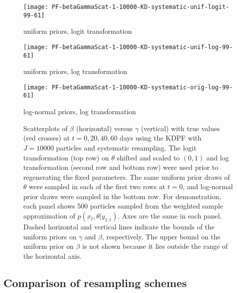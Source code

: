 \documentclass{elsarticle}
\begin{document}
\begin{figure}

\begin{minipage}{1.0\linewidth}
\texttt{[image: PF-betaGammaScat-1-10000-KD-systematic-unif-logit-99-61]}
\vspace{-1.0cm}
\caption*{uniform priors, logit transformation}
\end{minipage}

\vspace{0.5cm}

\begin{minipage}{1.0\linewidth}
\texttt{[image: PF-betaGammaScat-1-10000-KD-systematic-unif-log-99-61]}
\vspace{-1.0cm}
\caption*{uniform priors, log transformation}
\end{minipage}

\vspace{0.5cm}

\begin{minipage}{1.0\linewidth}
\texttt{[image: PF-betaGammaScat-1-10000-KD-systematic-orig-log-99-61]}
\vspace{-1.0cm}
\caption*{log-normal priors, log transformation}
\end{minipage}

\caption{Scatterplots of $\beta$ (horizontal) versus $\gamma$ (vertical) with true values (red crosses) at $t = 0, 20, 40, 60$ days using the KDPF with $J = 10000$ particles and systematic resampling. The logit transformation (top row) on $\theta$ shifted and scaled to $(0,1)$ and log transformation (second row and bottom row) were used prior to regenerating the fixed parameters. The same uniform prior draws of $\theta$ were sampled in each of the first two rows at $t = 0$, and log-normal prior draws were sampled in the bottom row. For demonstration, each panel shows 500 particles sampled from the weighted sample approximation of $p(x_t,\theta|y_{1:t})$. Axes are the same in each panel. Dashed horizontal and vertical lines indicate the bounds of the uniform priors on $\gamma$ and $\beta$, respectively. The upper bound on the uniform prior on $\beta$ is not shown because it lies outside the range of the horizontal axis.} \label{fig:priors}

\end{figure}

\subsection{Comparison of resampling schemes \label{sec:resample}}
\end{document}
